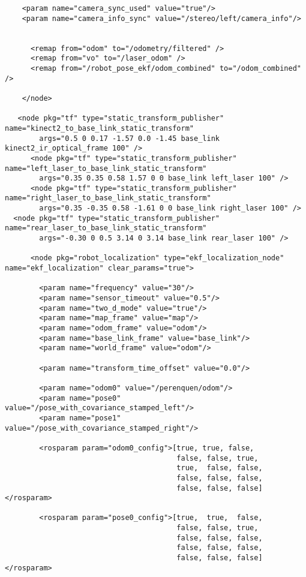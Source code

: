 \begin{center}
\begin{footnotesize}
\begin{verbatim}
    <param name="camera_sync_used" value="true"/>
    <param name="camera_info_sync" value="/stereo/left/camera_info"/>


      <remap from="odom" to="/odometry/filtered" />
      <remap from="vo" to="/laser_odom" />
      <remap from="/robot_pose_ekf/odom_combined" to="/odom_combined" /> 

    </node>

   <node pkg="tf" type="static_transform_publisher" name="kinect2_to_base_link_static_transform"
        args="0.5 0 0.17 -1.57 0.0 -1.45 base_link kinect2_ir_optical_frame 100" />
      <node pkg="tf" type="static_transform_publisher" name="left_laser_to_base_link_static_transform"
        args="0.35 0.35 0.58 1.57 0 0 base_link left_laser 100" />
      <node pkg="tf" type="static_transform_publisher" name="right_laser_to_base_link_static_transform"
        args="0.35 -0.35 0.58 -1.61 0 0 base_link right_laser 100" />
  <node pkg="tf" type="static_transform_publisher" name="rear_laser_to_base_link_static_transform"
        args="-0.30 0 0.5 3.14 0 3.14 base_link rear_laser 100" />

      <node pkg="robot_localization" type="ekf_localization_node" name="ekf_localization" clear_params="true">

        <param name="frequency" value="30"/>
        <param name="sensor_timeout" value="0.5"/>
        <param name="two_d_mode" value="true"/>
        <param name="map_frame" value="map"/>
        <param name="odom_frame" value="odom"/>
        <param name="base_link_frame" value="base_link"/>
        <param name="world_frame" value="odom"/>

        <param name="transform_time_offset" value="0.0"/>

        <param name="odom0" value="/perenquen/odom"/>
        <param name="pose0" value="/pose_with_covariance_stamped_left"/>
        <param name="pose1" value="/pose_with_covariance_stamped_right"/>

        <rosparam param="odom0_config">[true, true, false,
                                        false, false, true,
                                        true,  false, false,
                                        false, false, false,
                                        false, false, false]</rosparam>

        <rosparam param="pose0_config">[true,  true,  false,
                                        false, false, true,
                                        false, false, false,
                                        false, false, false,
                                        false, false, false]</rosparam>


\end{verbatim}
\end{footnotesize}
\end{center}
